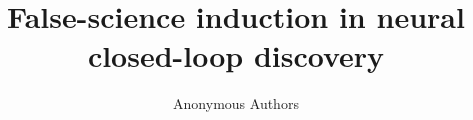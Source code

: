 \documentclass[11pt]{article}
\title{False-science induction in neural closed-loop discovery}
\author{Anonymous Authors}
\date{}
\begin{document}
\linenumbers
\maketitle

\begin{abstract}

\end{abstract}





\begingroup
\footnotesize
\setlength{\bibsep}{0pt plus 0.2ex}


\endgroup
\end{document}
